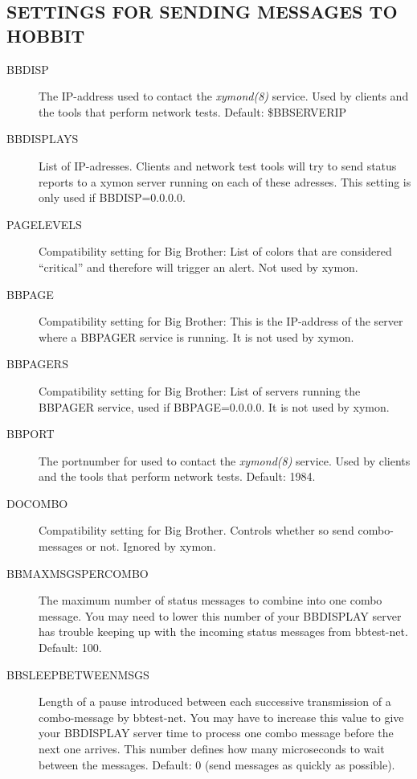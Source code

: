 \subsection{SETTINGS FOR SENDING MESSAGES TO HOBBIT}
\begin{description}
\item[BBDISP] The IP-address used to contact the \emph{xymond(8)}
 service. Used by clients and the tools that perform network tests. Default: \$BBSERVERIP 

 

\item[BBDISPLAYS] List of IP-adresses. Clients and network test tools will try to send status reports to a xymon server running on each of these adresses. This setting is only used if BBDISP=0.0.0.0. 

 

\item[PAGELEVELS] Compatibility setting for Big Brother: List of colors that are considered ``critical'' and therefore will trigger an alert. Not used by xymon. 

 

\item[BBPAGE] Compatibility setting for Big Brother: This is the IP-address of the server where a BBPAGER service is running. It is not used by xymon. 

 

\item[BBPAGERS] Compatibility setting for Big Brother: List of servers running the BBPAGER service, used if BBPAGE=0.0.0.0. It is not used by xymon. 

 

\item[BBPORT] The portnumber for used to contact the \emph{xymond(8)}
 service. Used by clients and the tools that perform network tests. Default: 1984. 

 

\item[DOCOMBO] Compatibility setting for Big Brother. Controls whether so send combo-messages or not. Ignored by xymon. 

 

\item[BBMAXMSGSPERCOMBO] The maximum number of status messages to combine into one combo message. You may need to lower this number of your BBDISPLAY server has trouble keeping up with the incoming status messages from bbtest-net. Default: 100. 

 

\item[BBSLEEPBETWEENMSGS] Length of a pause introduced between each successive transmission of a combo-message by bbtest-net. You may have to increase this value to give your BBDISPLAY server time to process one combo message before the next one arrives. This number defines how many microseconds to wait between the messages. Default: 0 (send messages as quickly as possible). 

 


 


\end{description}
